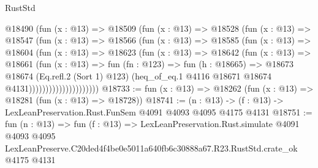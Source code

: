\begin{lexlean}{RustStd}
\begin{coremodule}
                      @18490
                        (fun (x : @13) =>
                        @18509
                          (fun (x : @13) =>
                          @18528
                            (fun (x : @13) =>
                            @18547
                              (fun (x : @13) =>
                              @18566
                                (fun (x : @13) =>
                                @18585
                                  (fun (x : @13) =>
                                  @18604
                                    (fun (x : @13) =>
                                    @18623
                                      (fun (x : @13) =>
                                      @18642
                                        (fun (x : @13) =>
                                        @18661
                                          (fun (x : @13) =>
                                          fun (fn : @123) =>
                                          fun (h : @18665) =>
                                          @18673
                                            @18674
                                            (Eq.refl.{2} (Sort 1) @123)
                                            (heq_of_eq.{1}
                                              @4116
                                              @18671
                                              @18674
                                              @4131)))))))))))))))))))))
@18733 := fun (x : @13) => @18262 (fun (x : @13) => @18281 (fun (x : @13) => @18728))
@18741 := (n : @13) -> (f : @13) -> LexLeanPreservation.Rust.FunSem @4091 @4093 @4095 @4175 @4131
@18751 := fun (n : @13) =>
  fun (f : @13) =>
  LexLeanPreservation.Rust.simulate
    @4091
    @4093
    @4095
    LexLeanPreserve.C20ded4f4be0e5011a640fb6c30888a67.R23.RustStd.crate_ok
    @4175
    @4131
\end{coremodule}
\end{lexlean}
